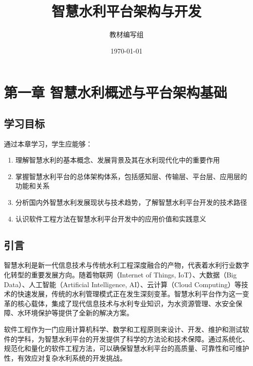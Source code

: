 \documentclass[UTF8,12pt,a4paper,oneside]{ctexbook}
\title{\textbf{智慧水利平台架构与开发}}
\author{教材编写组}
\date{\today}
\begin{document}
\maketitle
\newpage

\tableofcontents
\newpage

\section{第一章
智慧水利概述与平台架构基础}\label{ux7b2cux4e00ux7ae0-ux667aux6167ux6c34ux5229ux6982ux8ff0ux4e0eux5e73ux53f0ux67b6ux6784ux57faux7840}

\subsection{学习目标}\label{ux5b66ux4e60ux76eeux6807}

通过本章学习，学生应能够：

\begin{enumerate}
\def\labelenumi{\arabic{enumi}.}
\tightlist
\item
  理解智慧水利的基本概念、发展背景及其在水利现代化中的重要作用
\item
  掌握智慧水利平台的总体架构体系，包括感知层、传输层、平台层、应用层的功能和关系
\item
  分析国内外智慧水利发展现状与技术趋势，了解智慧水利平台开发的技术路径
\item
  认识软件工程方法在智慧水利平台开发中的应用价值和实践意义
\end{enumerate}

\subsection{引言}\label{ux5f15ux8a00}

智慧水利是新一代信息技术与传统水利工程深度融合的产物，代表着水利行业数字化转型的重要发展方向。随着物联网（Internet
of Things, IoT）、大数据（Big Data）、人工智能（Artificial Intelligence,
AI）、云计算（Cloud
Computing）等技术的快速发展，传统的水利管理模式正在发生深刻变革。智慧水利平台作为这一变革的核心载体，集成了现代信息技术与水利专业知识，为水资源管理、水安全保障、水环境保护等提供了全新的解决方案。

软件工程作为一门应用计算机科学、数学和工程原则来设计、开发、维护和测试软件的学科，为智慧水利平台的开发提供了科学的方法论和技术保障。通过系统化、规范化和量化的软件工程方法，可以确保智慧水利平台的高质量、可靠性和可维护性，有效应对复杂水利系统的开发挑战。
\end{document}
